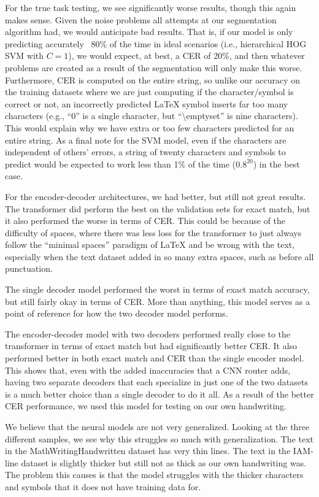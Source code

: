 \documentclass[11pt]{article}
\begin{document}
For the true task testing, we see significantly worse results, though this again makes sense. Given the noise problems all attempts at our segmentation algorithm had, we would anticipate bad results. That is, if our model is only predicting accurately ~80\% of the time in ideal scenarios (i.e., hierarchical HOG SVM with $C = 1$), we would expect, at best, a CER of 20\%, and then whatever problems are created as a result of the segmentation will only make this worse. Furthermore, CER is computed on the entire string, so unlike our accuracy on the training datasets where we are just computing if the character/symbol is correct or not, an incorrectly predicted LaTeX symbol inserts far too many characters (e.g., ``0'' is a single character, but ``\textbackslash emptyset'' is nine characters). This would explain why we have extra or too few characters predicted for an entire string. As a final note for the SVM model, even if the characters are independent of others' errors, a string of twenty characters and symbols to predict would be expected to work less than 1\% of the time ($0.8^{20}$) in the best case.

For the encoder-decoder architectures, we had better, but still not great results. The transformer did perform the best on the validation sets for exact match, but it also performed the worse in terms of CER. This could be because of the difficulty of spaces, where there was less loss for the transformer to just always follow the ``minimal spaces'' paradigm of LaTeX and be wrong with the text, especially when the text dataset added in so many extra spaces, such as before all punctuation.

The single decoder model performed the worst in terms of exact match accuracy, but still fairly okay in terms of CER. More than anything, this model serves as a point of reference for how the two decoder model performs.

The encoder-decoder model with two decoders performed really close to the transformer in terms of exact match but had significantly better CER. It also performed better in both exact match and CER than the single encoder model. This shows that, even with the added inaccuracies that a CNN router adds, having two separate decoders that each specialize in just one of the two datasets is a much better choice than a single decoder to do it all. As a result of the better CER performance, we used this model for testing on our own handwriting.

We believe that the neural models are not very generalized. Looking at the three different samples, we see why this struggles so much with generalization. The text in the MathWritingHandwritten dataset has very thin lines. The text in the IAM-line dataset is slightly thicker but still not as thick as our own handwriting was. The problem this causes is that the model struggles with the thicker characters and symbols that it does not have training data for.
\end{document}
